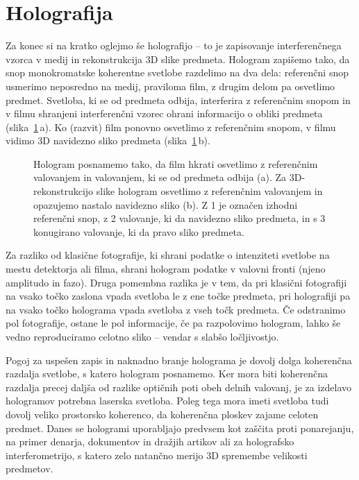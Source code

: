 \section{Holografija}
Za konec si na kratko oglejmo še holografijo -- to je zapisovanje interferenčnega vzorca v medij
in rekonstrukcija 3D slike predmeta. Hologram zapišemo tako, da snop monokromatske
koherentne svetlobe razdelimo na dva dela: referenčni snop usmerimo neposredno na medij, 
praviloma film, z drugim
delom pa osvetlimo predmet. Svetloba, ki se od predmeta odbija, interferira z referenčnim
snopom in v filmu shranjeni interferenčni vzorec ohrani informacijo o obliki predmeta 
(slika~\ref{fig:08_hologram}\,a). Ko
(razvit) film ponovno osvetlimo z referenčnim snopom, v filmu vidimo 3D navidezno 
sliko predmeta (slika~\ref{fig:08_hologram}\,b).
\begin{figure}[h]
\centering
\def\svgwidth{130truemm} 

\caption{Hologram posnamemo tako, da film hkrati osvetlimo z referenčnim valovanjem in 
valovanjem, ki se od predmeta odbija (a). Za 3D-rekonstrukcijo slike hologram osvetlimo
z referenčnim valovanjem in opazujemo nastalo navidezno sliko (b). Z 1 je označen izhodni referenčni
snop, z 2 valovanje, ki da navidezno sliko predmeta, in s 3 konugirano 
valovanje, ki da pravo sliko predmeta. 
}
\label{fig:08_hologram}
\end{figure}

Za razliko od klasične fotografije, ki shrani podatke o intenziteti svetlobe
na mestu detektorja ali filma, shrani hologram podatke v valovni fronti (njeno 
amplitudo in fazo). Druga pomembna razlika je v tem, da pri klasični fotografiji na vsako točko
zaslona vpada svetloba le z ene točke predmeta, pri holografiji pa na vsako točko holograma
vpada svetloba z vseh točk predmeta. Če odstranimo pol fotografije, ostane le pol informacije, 
če pa razpolovimo hologram, lahko še vedno reproduciramo celotno sliko -- vendar s slabšo 
ločljivostjo.

Pogoj za uspešen zapis in naknadno branje holograma je dovolj dolga koherenčna razdalja svetlobe, 
s katero hologram posnamemo. Ker mora biti koherenčna razdalja precej daljša od razlike
optičnih poti obeh delnih valovanj, je za izdelavo hologramov potrebna laserska svetloba.
Poleg tega mora imeti svetloba tudi dovolj veliko prostorsko koherenco, da koherenčna
ploskev zajame celoten predmet. Danes se hologrami uporabljajo predvsem kot zaščita
proti ponarejanju, na primer denarja, dokumentov in dražjih artikov ali za 
holografsko interferometrijo, s katero zelo natančno merijo 3D spremembe velikosti predmetov. 

